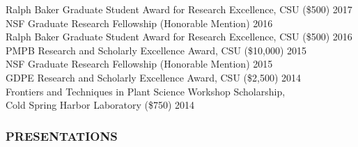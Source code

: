 \documentclass[12pt,english]{article}
\begin{document}
\hspace*{1.0em} Ralph Baker Graduate Student Award for Research Excellence, CSU (\$500)
\hfill 
2017
\vspace{1ex}\\
\hspace*{1.0em} NSF Graduate Research Fellowship (Honorable Mention)
\hfill 
2016
\vspace{1ex}\\
\hspace*{1.0em} Ralph Baker Graduate Student Award for Research Excellence, CSU (\$500)
\hfill 
2016
\vspace{1ex}\\
\hspace*{1.0em} PMPB Research and Scholarly Excellence Award, CSU (\$10,000)
\hfill 
2015
\vspace{1ex}\\
\hspace*{1.0em} NSF Graduate Research Fellowship (Honorable Mention)
\hfill 
2015
\vspace{1ex}\\
\hspace*{1.0em} GDPE Research and Scholarly Excellence Award, CSU (\$2,500)
\hfill 
2014
\vspace{1ex}\\
\hspace*{1.0em}  Frontiers and Techniques in Plant Science Workshop Scholarship,\\ 
\hspace*{1.0em} Cold Spring Harbor Laboratory   (\$750)
\hfill 
2014
\vspace{1ex}





\subsubsection*{PRESENTATIONS}
\vspace{-0.5ex}
\end{document}

